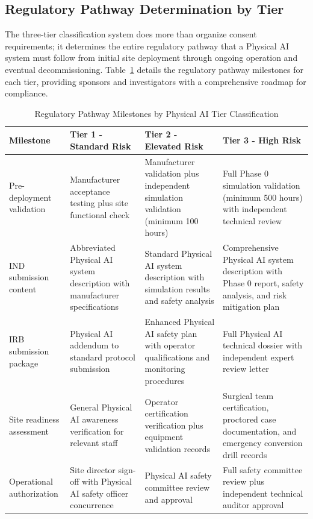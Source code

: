 \subsection{Regulatory Pathway Determination by Tier}
\label{subsec:cfr50-regulatory-pathway}

The three-tier classification system does more than organize consent
requirements; it determines the entire regulatory pathway that a Physical AI
system must follow from initial site deployment through ongoing operation and
eventual decommissioning. Table~\ref{tab:tier-regulatory-pathway} details the
regulatory pathway milestones for each tier, providing sponsors and
investigators with a comprehensive roadmap for compliance.

\begin{table}[H]
\centering
\caption{Regulatory Pathway Milestones by Physical AI Tier Classification}
\label{tab:tier-regulatory-pathway}
\small
\begin{tabularx}{\textwidth}{l X X X}
\toprule
\textbf{Milestone} & \textbf{Tier 1 - Standard Risk} & \textbf{Tier 2 - Elevated Risk} & \textbf{Tier 3 - High Risk} \\
\midrule
Pre-deployment validation & Manufacturer acceptance testing plus site functional check & Manufacturer validation plus independent simulation validation (minimum 100 hours) & Full Phase 0 simulation validation (minimum 500 hours) with independent technical review \\
\midrule
IND submission content & Abbreviated Physical AI system description with manufacturer specifications & Standard Physical AI system description with simulation results and safety analysis & Comprehensive Physical AI system description with Phase 0 report, safety analysis, and risk mitigation plan \\
\midrule
IRB submission package & Physical AI addendum to standard protocol submission & Enhanced Physical AI safety plan with operator qualifications and monitoring procedures & Full Physical AI technical dossier with independent expert review letter \\
\midrule
Site readiness assessment & General Physical AI awareness verification for relevant staff & Operator certification verification plus equipment validation records & Surgical team certification, proctored case documentation, and emergency conversion drill records \\
\midrule
Operational authorization & Site director sign-off with Physical AI safety officer concurrence & Physical AI safety committee review and approval & Full safety committee review plus independent technical auditor approval \\

\end{tabularx}
\end{table}
